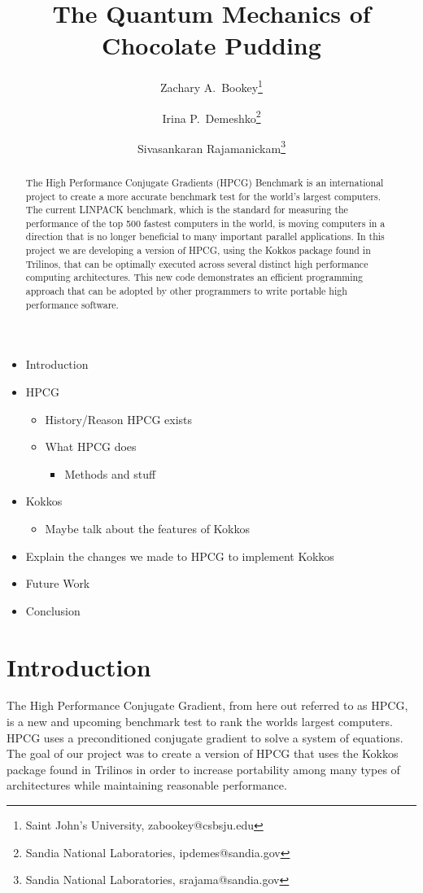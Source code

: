 \documentclass{ccr15}
\title{The Quantum Mechanics of Chocolate Pudding}
\author{Zachary A.\ Bookey\thanks{Saint John's University, zabookey@csbsju.edu} \and Irina P.\ Demeshko\thanks{Sandia National Laboratories,
ipdemes@sandia.gov} \and Sivasankaran Rajamanickam\thanks{Sandia National Laboratories, srajama@sandia.gov}}
\begin{document}
\maketitle

\begin{abstract}
The High Performance Conjugate Gradients (HPCG) Benchmark is an international project to create a
more accurate benchmark test for the world's largest computers. The current LINPACK benchmark,
which is the standard for measuring the performance of the top 500 fastest computers in the
world, is moving computers in a direction that is no longer beneficial to many important
parallel applications. In this project we are developing a version of HPCG, using the Kokkos
package found in Trilinos, that can be optimally executed across several distinct high
performance computing architectures. This new code demonstrates an efficient programming 
approach that can be adopted by other programmers to write portable high performance software.
\end{abstract}

\begin{itemize}
	\item Introduction
	\item HPCG
	\begin{itemize}
		\item History/Reason HPCG exists
		\item What HPCG does
		\begin{itemize}
			\item Methods and stuff
		\end{itemize}
	\end{itemize}
	\item Kokkos
	\begin{itemize}
		\item Maybe talk about the features of Kokkos
	\end{itemize}
	\item Explain the changes we made to HPCG to implement Kokkos
	\item Future Work
	\item Conclusion
\end{itemize}

\section{Introduction}
The High Performance Conjugate Gradient, from here out referred to as HPCG, is a new and
upcoming benchmark test to rank the worlds largest computers. HPCG uses a preconditioned 
conjugate gradient to solve a system of equations. The goal of our project was to create a
version of HPCG that uses the Kokkos package found in Trilinos in order to increase portability
among many types of architectures while maintaining reasonable performance.
\end{document}
